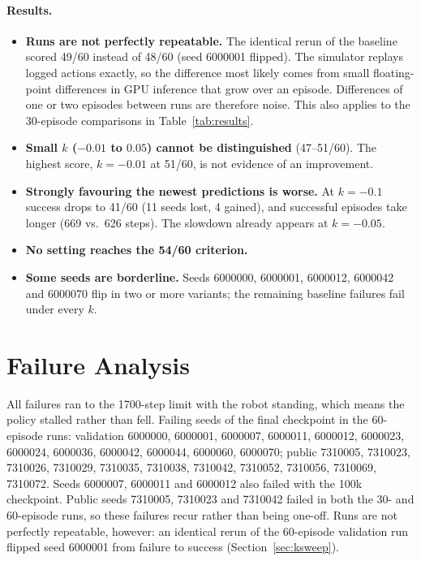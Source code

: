 \documentclass[11pt,a4paper]{article}
\begin{document}
\paragraph{Results.}
\begin{itemize}
  \item \textbf{Runs are not perfectly repeatable.} The identical rerun of
        the baseline scored 49/60 instead of 48/60 (seed 6000001 flipped).
        The simulator replays logged actions exactly, so the difference most
        likely comes from small floating-point differences in GPU
        inference that grow over an episode. Differences of one or two
        episodes between runs are therefore noise. This also applies to
        the 30-episode comparisons in Table~\ref{tab:results}.
  \item \textbf{Small $k$ ($-0.01$ to $0.05$) cannot be distinguished}
        (47--51/60). The highest score, $k=-0.01$
        at 51/60, is not evidence of an improvement.
  \item \textbf{Strongly favouring the newest predictions is worse.} At
        $k=-0.1$ success drops to 41/60 (11 seeds lost, 4 gained), and
        successful episodes take longer (669 vs.\ 626 steps). The slowdown
        already appears at $k=-0.05$.
  \item \textbf{No setting reaches the 54/60 criterion.}
  \item \textbf{Some seeds are borderline.} Seeds 6000000, 6000001,
        6000012, 6000042 and 6000070 flip in two or more variants; the
        remaining baseline failures fail under every $k$.
\end{itemize}

\section{Failure Analysis}
\label{sec:failures}

All failures ran to the 1700-step limit with the robot standing, which
means the policy stalled rather than fell. Failing seeds of the final
checkpoint in the 60-episode runs:
validation 6000000, 6000001, 6000007, 6000011, 6000012, 6000023, 6000024,
6000036, 6000042, 6000044, 6000060, 6000070;
public 7310005, 7310023, 7310026, 7310029, 7310035, 7310038, 7310042,
7310052, 7310056, 7310069, 7310072.
Seeds 6000007, 6000011 and 6000012 also failed with the 100k checkpoint.
Public seeds 7310005, 7310023 and 7310042 failed in both the 30- and
60-episode runs, so these failures recur rather than being one-off. Runs are
not perfectly repeatable, however: an identical rerun of the 60-episode
validation run flipped seed 6000001 from failure to success
(Section~\ref{sec:ksweep}).
\end{document}
